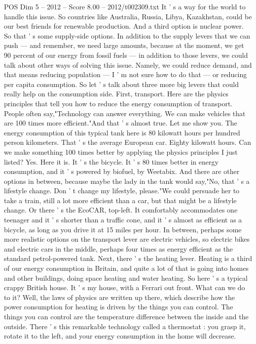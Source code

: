 \begin{textsample}{POS Dim 5 – 2012 – Score 8.00 – 2012/t002309.txt}
It ' s a way for the world to handle this issue.
So countries like Australia, Russia, Libya, Kazakhstan, could be our best friends for renewable production.
And a third option is nuclear power.
So that ' s some supply-side options.
In addition to the supply levers that we can push — and remember, we need large amounts, because at the moment, we get 90 percent of our energy from fossil fuels — in addition to those levers, we could talk about other ways of solving this issue.
Namely, we could reduce demand, and that means reducing population — I ' m not sure how to do that — or reducing per capita consumption.
So let ' s talk about three more big levers that could really help on the consumption side.
First, transport.
Here are the physics principles that tell you how to reduce the energy consumption of transport.
People often say,"Technology can answer everything.
We can make vehicles that are 100 times more efficient."And that ' s almost true.
Let me show you.
The energy consumption of this typical tank here is 80 kilowatt hours per hundred person kilometers.
That ' s the average European car.
Eighty kilowatt hours.
Can we make something 100 times better by applying the physics principles I just listed?
Yes.
Here it is.
It ' s the bicycle.
It ' s 80 times better in energy consumption, and it ' s powered by biofuel, by Weetabix.
And there are other options in between, because maybe the lady in the tank would say,"No, that ' s a lifestyle change.
Don ' t change my lifestyle, please."We could persuade her to take a train, still a lot more efficient than a car, but that might be a lifestyle change.
Or there ' s the EcoCAR, top-left.
It comfortably accommodates one teenager and it ' s shorter than a traffic cone, and it ' s almost as efficient as a bicycle, as long as you drive it at 15 miles per hour.
In between, perhaps some more realistic options on the transport lever are electric vehicles, so electric bikes and electric cars in the middle, perhaps four times as energy efficient as the standard petrol-powered tank.
Next, there ' s the heating lever.
Heating is a third of our energy consumption in Britain, and quite a lot of that is going into homes and other buildings, doing space heating and water heating.
So here ' s a typical crappy British house.
It ' s my house, with a Ferrari out front.
What can we do to it?
Well, the laws of physics are written up there, which describe how the power consumption for heating is driven by the things you can control.
The things you can control are the temperature difference between the inside and the outside.
There ' s this remarkable technology called a thermostat : you grasp it, rotate it to the left, and your energy consumption in the home will decrease.

\end{textsample}
